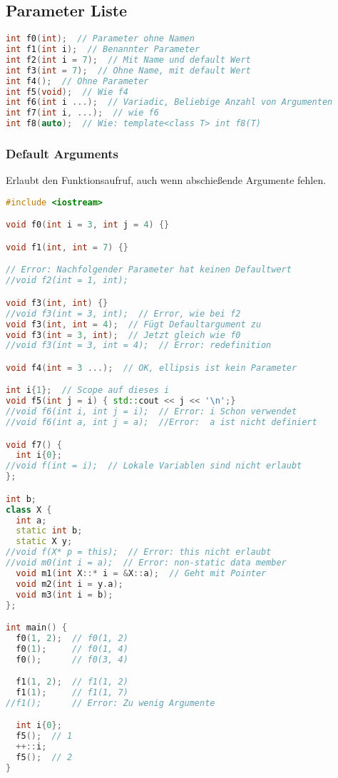 \subsection{Parameter Liste}

\begin{lstlisting}[language=C++]
int f0(int);  // Parameter ohne Namen
int f1(int i);  // Benannter Parameter
int f2(int i = 7);  // Mit Name und default Wert
int f3(int = 7);  // Ohne Name, mit default Wert
int f4();  // Ohne Parameter
int f5(void);  // Wie f4
int f6(int i ...);  // Variadic, Beliebige Anzahl von Argumenten
int f7(int i, ...);  // wie f6
int f8(auto);  // Wie: template<class T> int f8(T)
\end{lstlisting}

\subsubsection{Default Arguments}

Erlaubt den Funktionsaufruf, auch wenn abschießende Argumente fehlen.

\begin{lstlisting}[language=C++]
#include <iostream>

void f0(int i = 3, int j = 4) {}

void f1(int, int = 7) {}

// Error: Nachfolgender Parameter hat keinen Defaultwert
//void f2(int = 1, int);

void f3(int, int) {}
//void f3(int = 3, int);  // Error, wie bei f2
void f3(int, int = 4);  // Fügt Defaultargument zu
void f3(int = 3, int);  // Jetzt gleich wie f0
//void f3(int = 3, int = 4);  // Error: redefinition

void f4(int = 3 ...);  // OK, ellipsis ist kein Parameter

int i{1};  // Scope auf dieses i
void f5(int j = i) { std::cout << j << '\n';}
//void f6(int i, int j = i);  // Error: i Schon verwendet
//void f6(int a, int j = a);  //Error:  a ist nicht definiert

void f7() {
  int i{0};
//void f(int = i);  // Lokale Variablen sind nicht erlaubt
};

int b;
class X {
  int a;
  static int b;
  static X y;
//void f(X* p = this);  // Error: this nicht erlaubt
//void m0(int i = a);  // Error: non-static data member
  void m1(int X::* i = &X::a);  // Geht mit Pointer
  void m2(int i = y.a);
  void m3(int i = b);
};

int main() {
  f0(1, 2);  // f0(1, 2)
  f0(1);     // f0(1, 4)
  f0();      // f0(3, 4)

  f1(1, 2);  // f1(1, 2)
  f1(1);     // f1(1, 7)
//f1();      // Error: Zu wenig Argumente

  int i{0};
  f5();  // 1
  ++::i;
  f5();  // 2
}
\end{lstlisting}

